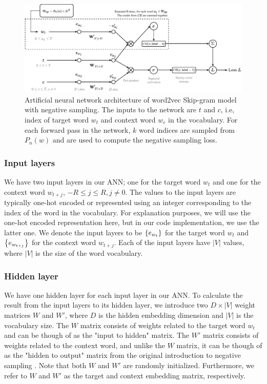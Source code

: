 \begin{figure}[ht]
    \centering
    \includegraphics[width=16cm]{thesis/figures/word2vec-sgns_cropped.pdf}
    \caption{Artificial neural network architecture of word2vec Skip-gram model with negative sampling. The inputs to the network are $t$ and $c$, i.e, index of target word $w_t$ and context word $w_c$ in the vocabulary. For each forward pass in the network, $k$ word indices are sampled from $P_n(w)$ and are used to compute the negative sampling loss.}
    \label{fig:word2vec-skip-gram-negative-sampling}
\end{figure}

\subsubsection{Input layers}
We have two input layers in our ANN; one for the target word $w_t$ and one for the context word $w_{t+j}$, $-R \leq j \leq R, j \neq 0$. The values to the input layers are typically one-hot encoded or represented using an integer corresponding to the index of the word in the vocabulary. For explanation purposes, we will use the one-hot encoded representation here, but in our code implementation, we use the latter one. We denote the input layers to be $\left\{e_{w_t}\right\}$ for the target word $w_t$ and $\left\{e_{w_{t+j}}\right\}$ for the context word $w_{t+j}$. Each of the input layers have $|V|$ values, where $|V|$ is the size of the word vocabulary.

\subsubsection{Hidden layer}
We have one hidden layer for each input layer in our ANN. To calculate the result from the input layers to its hidden layer, we introduce two $D \times |V|$ weight matrices $W$ and $W'$, where $D$ is the hidden embedding dimension and $|V|$ is the vocabulary size. The $W$ matrix consists of weights related to the target word $w_t$ and can be though of as the "input to hidden" matrix. The $W'$ matrix consists of weights related to the context word, and unlike the $W$ matrix, it can be though of as the "hidden to output" matrix from the original introduction to negative sampling \cite{mikolov2013b}. Note that both $W$ and $W'$ are randomly initialized. Furthermore, we refer to $W$ and $W'$ as the target and context embedding matrix, respectively.

